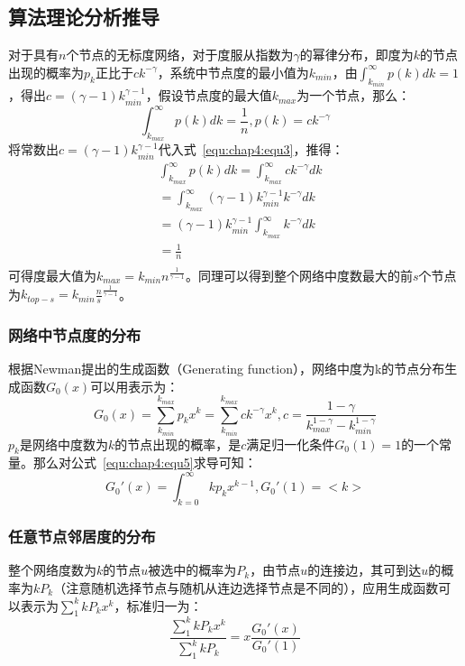 \subsection{算法理论分析推导}
对于具有$n$个节点的无标度网络，对于度服从指数为$\gamma$的幂律分布，即度为$k$的节点出现的概率为$p_k$正比于$ck^{-\gamma}$，系统中节点度的最小值为$k_{min}$，由$\int_{k_{min}}^{\infty}p(k)dk=1$，得出$c=(\gamma -1)k_{min}^{\gamma -1}$，假设节点度的最大值$k_{max}$为一个节点，那么：
\begin{equation}
\label{equ:chap4:equ3}
\int_{k_{max}}^{\infty}p(k)dk=\frac{1}{n},p(k)=ck^{-\gamma}
\end{equation}
将常数出$c=(\gamma -1)k_{min}^{\gamma -1}$代入式~\ref{equ:chap4:equ3}，推得：
\begin{equation}
\label{equ:chap4:equ4}
	\begin{split}
	& \int_{k_{max}}^{\infty}p(k)dk=\int_{k_{max}}^{\infty}ck^{-\gamma}dk \\
	& =\int_{k_{max}}^{\infty}(\gamma -1)k_{min}^{\gamma -1}k^{-\gamma}dk \\
	& =(\gamma -1)k_{min}^{\gamma -1}\int_{k_{max}}^{\infty}k^{-\gamma}dk \\
	& =\frac{1}{n} \\
	\end{split}
\end{equation}
可得度最大值为$k_{max}=k_{min}n^{\frac{1}{\gamma -1}}$。同理可以得到整个网络中度数最大的前$s$个节点为$k_{top-s}=k_{min}\frac{n}{s}^{\frac{1}{\gamma -1}}$。
\subsubsection{网络中节点度的分布}
根据Newman\cite{newman2001random}提出的生成函数（Generating function），网络中度为k的节点分布生成函数$G_0(x)$可以用表示为：
\begin{equation} 
\label{equ:chap4:equ5}
G_{0}(x) = \sum_{k_{min}}^{k_{max}}p_{k}x^{k} = \sum_{k_{min}}^{k_{max}}ck^{-\gamma}x^{k}, c = \frac{1-\gamma}{k_{max}^{1-\gamma}-k_{min}^{1-\gamma}}
\end{equation}
$p_k$是网络中度数为$k$的节点出现的概率，是$c$满足归一化条件$G_0(1)=1$的一个常量。那么对公式~\ref{equ:chap4:equ5}求导可知：
\begin{equation} 
\label{equ:chap4:equ51}
G_{0}'(x) = \int_{k=0}^{\infty}kp_kx^{k-1},G_{0}'(1)=<k>
\end{equation}
\subsubsection{任意节点邻居度的分布}
整个网络度数为$k$的节点$u$被选中的概率为$P_k$，由节点$u$的连接边，其可到达$u$的概率为$kP_k$（注意随机选择节点与随机从连边选择节点是不同的），应用生成函数可以表示为$\sum_{1}^{k}kP_kx^k$，标准归一为：
\begin{equation} 
\label{equ:chap4:equ52}
\frac{\sum_{1}^{k}kP_kx^k}{\sum_{1}^{k}kP_k}=x\frac{G_0'(x)}{G_0'(1)}
\end{equation}

